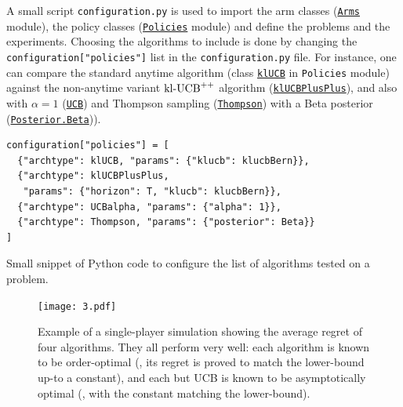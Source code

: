 A small script \texttt{configuration.py}
is used to import the arm classes (\texttt{\href{https://SMPyBandits.GitHub.io/docs/Arms.html}{Arms}} module), the policy classes (\texttt{\href{https://SMPyBandits.GitHub.io/docs/Policies.html}{Policies}} module) and define the problems and the experiments.
Choosing the algorithms to include is done by changing
the \texttt{configuration["policies"]} list in the \texttt{configuration.py} file.
For instance, one can compare the standard anytime \klUCB{} algorithm (class \texttt{\href{https://SMPyBandits.GitHub.io/docs/Policies.klUCB.html}{klUCB}} in \texttt{Policies} module) against the non-anytime variant $\mathrm{kl}\text{-}\mathrm{UCB}^{++}$ algorithm (\texttt{\href{https://SMPyBandits.GitHub.io/docs/Policies.klUCBPlusPlus.html}{klUCBPlusPlus}}), and also \UCB{} with $\alpha=1$ (\texttt{\href{https://SMPyBandits.GitHub.io/docs/Policies.UCBalpha.html}{UCB}}) and Thompson sampling (\texttt{\href{https://SMPyBandits.GitHub.io/docs/Policies.Thompson.html}{Thompson}}) with a Beta posterior (\texttt{\href{https://SMPyBandits.GitHub.io/docs/Policies.Posterior.Beta.html}{Posterior.Beta}})).

\begin{small}
\begin{listing}[h!]
    \begin{verbatim}
configuration["policies"] = [
  {"archtype": klUCB, "params": {"klucb": klucbBern}},
  {"archtype": klUCBPlusPlus,
   "params": {"horizon": T, "klucb": klucbBern}},
  {"archtype": UCBalpha, "params": {"alpha": 1}},
  {"archtype": Thompson, "params": {"posterior": Beta}}
]
    \end{verbatim}
    \caption{Small snippet of Python code to configure the list of algorithms tested on a problem.}
    \label{lst:3:howToConfigureAlgorithms}
\end{listing}
\end{small}

\begin{figure}[h!]  %
	\centering
	\texttt{[image: 3.pdf]}
	\caption[Example of a single-player simulation showing the average regret of $4$ algorithms]{
		Example of a single-player simulation showing the average regret of four algorithms. They all perform very well: each algorithm is known to be order-optimal (\ie, its regret is proved to match the lower-bound up-to a constant), and each but UCB is known to be asymptotically optimal (\ie, with the constant matching the lower-bound).
	}
	\label{fig:3:firstPlot}
\end{figure}

